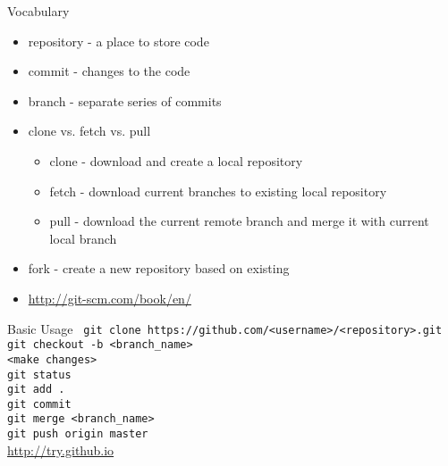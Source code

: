 \documentclass[mathserif]{beamer}
\begin{document}
\begin{frame}{Vocabulary}
\begin{itemize}
\item repository - a place to store code
\item commit - changes to the code
\item branch - separate series of commits
\item clone vs. fetch vs. pull
\begin{itemize}
  \item clone - download and create a local repository
  \item fetch - download current branches to existing local repository
  \item pull - download the current remote branch and merge it with current local branch
\end{itemize}
\item fork - create a new repository based on existing
\item {\url{http://git-scm.com/book/en/}}
\end{itemize}
\end{frame}

\begin{frame}{Basic Usage}
\texttt{\small
git clone https://github.com/<username>/<repository>.git\\
git checkout -b <branch\_name>\\
<make changes>\\
git status\\
git add .\\
git commit\\
git merge <branch\_name>\\
git push origin master\\
}
\vspace{.3in}
\url{http://try.github.io}
\end{frame}
\end{document}
